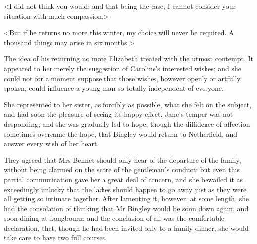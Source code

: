 <I did not think you would; and that being the case, I cannot consider your situation with much compassion.>

<But if he returns no more this winter, my choice will never be required. A thousand things may arise in six months.>

The idea of his returning no more Elizabeth treated with the utmost contempt. It appeared to her merely the suggestion of Caroline's interested wishes; and she could not for a moment suppose that those wishes, however openly or artfully spoken, could influence a young man so totally independent of everyone.

She represented to her sister, as forcibly as possible, what she felt on the subject, and had soon the pleasure of seeing its happy effect. Jane's temper was not desponding; and she was gradually led to hope, though the diffidence of affection sometimes overcame the hope, that Bingley would return to Netherfield, and answer every wish of her heart.

They agreed that Mrs Bennet should only hear of the departure of the family, without being alarmed on the score of the gentleman's conduct; but even this partial communication gave her a great deal of concern, and she bewailed it as exceedingly unlucky that the ladies should happen to go away just as they were all getting so intimate together. After lamenting it, however, at some length, she had the consolation of thinking that Mr Bingley would be soon down again, and soon dining at Longbourn; and the conclusion of all was the comfortable declaration, that, though he had been invited only to a family dinner, she would take care to have two full courses.
